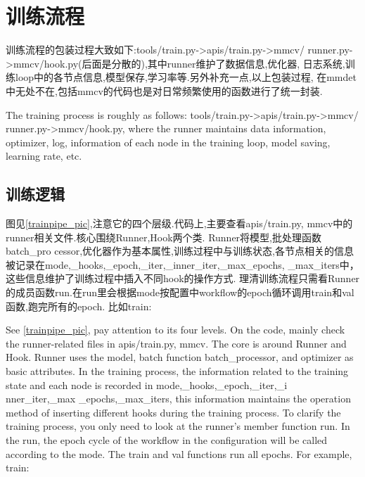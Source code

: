 \documentclass[UTF8]{ctexart}
\begin{document}
\section{训练流程}
训练流程的包装过程大致如下:tools/train.py->apis/train.py->mmcv/
runner.py->mmcv/hook.py(后面是分散的),其中runner维护了数据信息,优化器,
日志系统,训练loop中的各节点信息,模型保存,学习率等.另外补充一点,以上包装过程,
在mmdet中无处不在,包括mmcv的代码也是对日常频繁使用的函数进行了统一封装.

The training process is roughly as follows: tools/train.py->apis/train.py->mmcv/
runner.py->mmcv/hook.py, where the runner maintains data information, optimizer, log, 
information of each node in the training loop, model saving, learning rate, etc.

\label{trainpipeline}
\subsection{训练逻辑}
图见\ref{trainpipe_pic},注意它的四个层级.代码上,主要查看apis/train.py, mmcv中的runner相关文件.核心围绕Runner,Hook两个类.
Runner将模型,批处理函数batch\_pro
cessor,优化器作为基本属性,训练过程中与训练状态,各节点相关的信息
被记录在mode,\_hooks,\_epoch,\_iter,\_inner\_iter,\_max\_epochs,
\_max\_iters中，这些信息维护了训练过程中插入不同hook的操作方式.
理清训练流程只需看Runner的成员函数run.在run里会根据mode按配置中workflow的epoch循环调用train和val函数,跑完所有的epoch.
比如train:

See \ref{trainpipe_pic}, pay attention to its four levels. On the code, mainly
check the runner-related files in apis/train.py, mmcv. The core is around Runner and Hook.
Runner uses the model, batch function batch\_processor, and optimizer as basic attributes.
In the training process, the information related to the training state and each node is recorded 
in mode,\_hooks,\_epoch,\_iter,\_i \newline
nner\_iter,\_max \_epochs,\_max\_iters, this information maintains 
the operation method of inserting different hooks during the training process. To clarify the training 
process, you only need to look at the runner’s member function run. In the run, the epoch cycle of the 
workflow in the configuration will be called according to the mode. The train and val functions run all 
epochs. For example, train:
\end{document}
